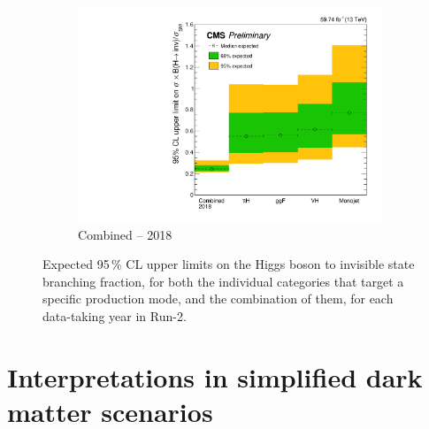 \begin{figure}[htbp]
    \begin{subfigure}[b]{0.45\textwidth}
        \includegraphics[width=\textwidth]{figures/limits/limit_2018_comb_Scenario4.pdf}
        \caption{Combined -- 2018}
    \end{subfigure}
    \caption[Expected 95\,\% CL upper limits on the Higgs boson to invisible state branching fraction, for both the individual categories that target a specific production mode, and the combination of them, for each data-taking year in Run-2]{Expected 95\,\% CL upper limits on the Higgs boson to invisible state branching fraction, for both the individual categories that target a specific production mode, and the combination of them, for each data-taking year in Run-2.}
    \label{fig:htoinv_limit_each_year}
\end{figure}






\section{Interpretations in simplified dark matter scenarios}
\label{sec:htoinv_dark_matter_models}

